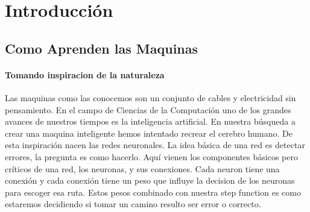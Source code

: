 \section {Introducci\'on}
\subsection {Como Aprenden las Maquinas}
\paragraph{Tomando inspiracion de la naturaleza}Las maquinas como las conocemos son un conjunto de cables y electricidad sin pensamiento. En el campo de Ciencias de la Computaci\'on uno de los grandes avances de nuestros tiempos es la inteligencia artificial. En nuestra b\'usqueda a crear una maquina inteligente hemos intentado recrear el cerebro humano. De esta inspiraci\'on nacen las redes neuronales. La idea b\'asica de una red es detectar errores, la pregunta es como hacerlo. Aqu\'i vienen los componentes b\'asicos pero cr\'iticos de una red, los neuronas, y sus conexiones. Cada neuron tiene una conexi\'on y cada conexi\'on tiene un peso que influye la decision de los neuronas para escoger esa ruta. Estos pesos combinado con nuestra step function es como estaremos decidiendo si tomar un camino resulto ser error o correcto.
